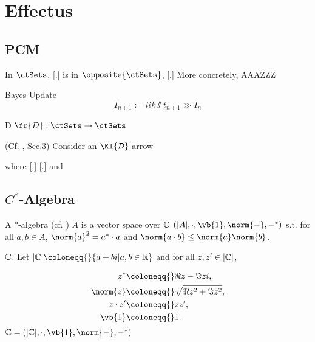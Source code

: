 \section{Effectus}

\subsection{PCM}



\cite{Jac15}
In $\ctSets$,
[.]
is in $\opposite{\ctSets}$,
[.]
More concretely, 
AAAZZZ 



\begin{Def}{Bayes Update} 
\begin{equation}
    I_{n+1} := lik \sslash t_{n+1}  \gg I_{n}
\end{equation}
\end{Def}

\begin{Def}{D}
$\fr{D} : \ctSets \to \ctSets $
\end{Def}

\begin{Eg}(Cf. \cite{JZ16}, Sec.3)
Consider an $\Kl{\mathcal{D}}$-arrow

where 
[,]
[.]
and


\end{Eg}






\subsection{$C^*$-Algebra}

\begin{Def}A $*$-algebra (cf. \parencite[Sec.\todoFill{}]{Jac15}) $A$ is a vector space over $\Bbb{C} $ $(|A|, \cdot, \vb{1}, \norm{-}, -^*)$ s.t. for all $a,b \in A$, $\norm{a}^2 = a^* \cdot a$ and $\norm{a \cdot b} \leq \norm{a}\norm{b}$.
\end{Def}

\begin{Eg} $\Bbb{C}$. Let $|\Bbb{C}| \coloneqq{} \{a+bi | a,b \in \Bbb{R} \} $ and for all $z,z' \in |\Bbb{C}|$,

\begin{alignat*}{2}
z^*         \coloneqq{}& \Re{z} - \Im{z}i, \\
\norm{z}    \coloneqq{}& \sqrt{\Re{z}^2 + \Im{z}^2}, \\
z \cdot z'  \coloneqq{}& zz', \\
\vb{1}      \coloneqq{}& 1.
\end{alignat*}
$\Bbb{C} = (|\Bbb{C}|, \cdot, \vb{1}, \norm{-}, -^*)$
\end{Eg}

